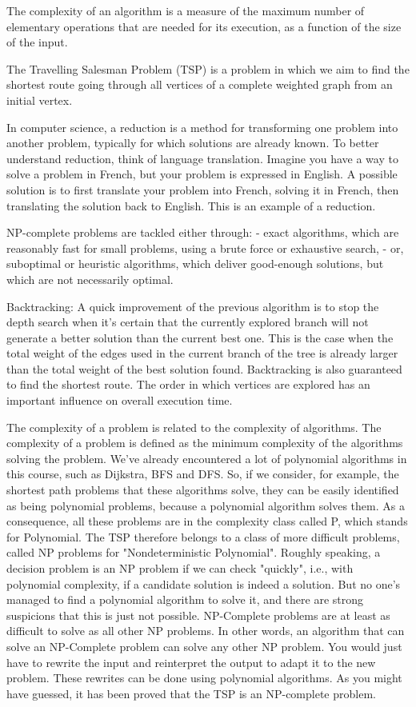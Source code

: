 The complexity of an algorithm is a measure of the maximum number of elementary operations that are needed for its execution, as a function of the size of the input.

The Travelling Salesman Problem (TSP) is a problem in which we aim to find the shortest route going through all vertices of a complete weighted graph from an initial vertex.

In computer science, a reduction is a method for transforming one problem into another problem, typically for which solutions are already known.
To better understand reduction, think of language translation. Imagine you have a way to solve a problem in French, but your problem is expressed in English. A possible solution is to first translate your problem into French, solving it in French, then translating the solution back to English. This is an example of a reduction.

NP-complete problems are tackled either through:
- exact algorithms, which are reasonably fast for small problems, using a brute force or exhaustive search,
- or, suboptimal or heuristic algorithms, which deliver good-enough solutions, but which are not necessarily optimal.

Backtracking: A quick improvement of the previous algorithm is to stop the depth search when it's certain that the currently explored branch will not generate a better solution than the current best one. This is the case when the total weight of the edges used in the current branch of the tree is already larger than the total weight of the best solution found.
Backtracking is also guaranteed to find the shortest route. The order in which vertices are explored has an important influence on overall execution time.

The complexity of a problem is related to the complexity of algorithms. The complexity of a problem is defined as the minimum complexity of the algorithms solving the problem.
We've already encountered a lot of polynomial algorithms in this course, such as Dijkstra, BFS and DFS. So, if we consider, for example, the shortest path problems that these algorithms solve, they can be easily identified as being polynomial problems, because a polynomial algorithm solves them. As a consequence, all these problems are in the complexity class called P, which stands for Polynomial.
The TSP therefore belongs to a class of more difficult problems, called NP problems for "Nondeterministic Polynomial". Roughly speaking, a decision problem is an NP problem if we can check "quickly", i.e., with polynomial complexity, if a candidate solution is indeed a solution.
But no one's managed to find a polynomial algorithm to solve it, and there are strong suspicions that this is just not possible.
NP-Complete problems are at least as difficult to solve as all other NP problems. In other words, an algorithm that can solve an NP-Complete problem can solve any other NP problem. You would just have to rewrite the input and reinterpret the output to adapt it to the new problem. These rewrites can be done using polynomial algorithms.
As you might have guessed, it has been proved that the TSP is an NP-complete problem.

